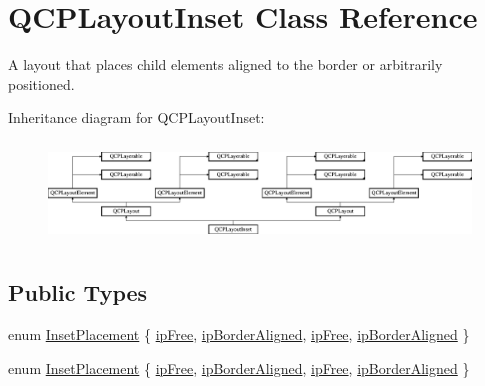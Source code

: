 \hypertarget{class_q_c_p_layout_inset}{}\section{Q\+C\+P\+Layout\+Inset Class Reference}
\label{class_q_c_p_layout_inset}


A layout that places child elements aligned to the border or arbitrarily positioned.  


Inheritance diagram for Q\+C\+P\+Layout\+Inset\+:\begin{figure}[H]
\begin{center}
\leavevmode
\includegraphics[height=2.713178cm]{class_q_c_p_layout_inset}
\end{center}
\end{figure}
\subsection*{Public Types}
\begin{DoxyCompactItemize}
\item 
enum \hyperlink{class_q_c_p_layout_inset_a8b9e17d9a2768293d2a7d72f5e298192}{Inset\+Placement} \{ \hyperlink{class_q_c_p_layout_inset_a8b9e17d9a2768293d2a7d72f5e298192a06556307ae5b8255297984219da4e8f4}{ip\+Free}, 
\hyperlink{class_q_c_p_layout_inset_a8b9e17d9a2768293d2a7d72f5e298192a41ae236f04e42d7098e09fd49dffeb06}{ip\+Border\+Aligned}, 
\hyperlink{class_q_c_p_layout_inset_a8b9e17d9a2768293d2a7d72f5e298192a06556307ae5b8255297984219da4e8f4}{ip\+Free}, 
\hyperlink{class_q_c_p_layout_inset_a8b9e17d9a2768293d2a7d72f5e298192a41ae236f04e42d7098e09fd49dffeb06}{ip\+Border\+Aligned}
 \}
\item 
enum \hyperlink{class_q_c_p_layout_inset_a8b9e17d9a2768293d2a7d72f5e298192}{Inset\+Placement} \{ \hyperlink{class_q_c_p_layout_inset_a8b9e17d9a2768293d2a7d72f5e298192a06556307ae5b8255297984219da4e8f4}{ip\+Free}, 
\hyperlink{class_q_c_p_layout_inset_a8b9e17d9a2768293d2a7d72f5e298192a41ae236f04e42d7098e09fd49dffeb06}{ip\+Border\+Aligned}, 
\hyperlink{class_q_c_p_layout_inset_a8b9e17d9a2768293d2a7d72f5e298192a06556307ae5b8255297984219da4e8f4}{ip\+Free}, 
\hyperlink{class_q_c_p_layout_inset_a8b9e17d9a2768293d2a7d72f5e298192a41ae236f04e42d7098e09fd49dffeb06}{ip\+Border\+Aligned}
 \}
\end{DoxyCompactItemize}
